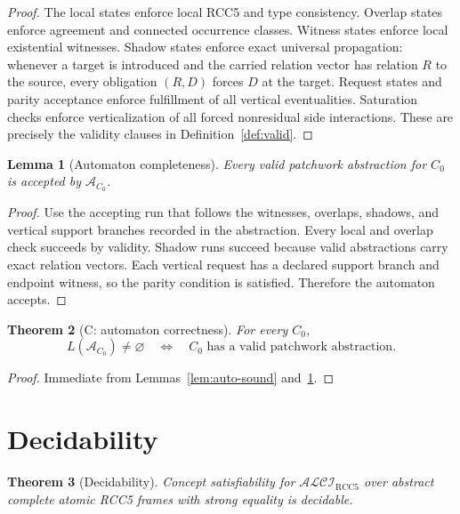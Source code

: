 \documentclass[11pt]{article}
\newtheorem{theorem}{Theorem}[section]
\newtheorem{lemma}[theorem]{Lemma}
\newcommand{\RCC}{\mathrm{RCC5}}
\newcommand{\APTA}{\mathcal A}
\begin{document}
\begin{proof}
The local states enforce local RCC5 and type consistency.  Overlap states enforce agreement and connected occurrence classes.  Witness states enforce local existential witnesses.  Shadow states enforce exact universal propagation: whenever a target is introduced and the carried relation vector has relation $R$ to the source, every obligation $(R,D)$ forces $D$ at the target.  Request states and parity acceptance enforce fulfillment of all vertical eventualities.  Saturation checks enforce verticalization of all forced nonresidual side interactions.  These are precisely the validity clauses in Definition~\ref{def:valid}.
\end{proof}

\begin{lemma}[Automaton completeness]\label{lem:auto-complete}
Every valid patchwork abstraction for $C_0$ is accepted by $\APTA_{C_0}$.
\end{lemma}

\begin{proof}
Use the accepting run that follows the witnesses, overlaps, shadows, and vertical support branches recorded in the abstraction.  Every local and overlap check succeeds by validity.  Shadow runs succeed because valid abstractions carry exact relation vectors.  Each vertical request has a declared support branch and endpoint witness, so the parity condition is satisfied.  Therefore the automaton accepts.
\end{proof}

\begin{theorem}[C: automaton correctness]\label{thm:C}
For every $C_0$,
\[
L(\APTA_{C_0})\ne\varnothing
\quad\Longleftrightarrow\quad
C_0\text{ has a valid patchwork abstraction.}
\]
\end{theorem}

\begin{proof}
Immediate from Lemmas~\ref{lem:auto-sound} and~\ref{lem:auto-complete}.
\end{proof}

\section{Decidability}

\begin{theorem}[Decidability]\label{thm:dec}
Concept satisfiability for $\mathcal{ALCI}_{\RCC}$ over abstract complete atomic RCC5 frames with strong equality is decidable.
\end{theorem}
\end{document}
